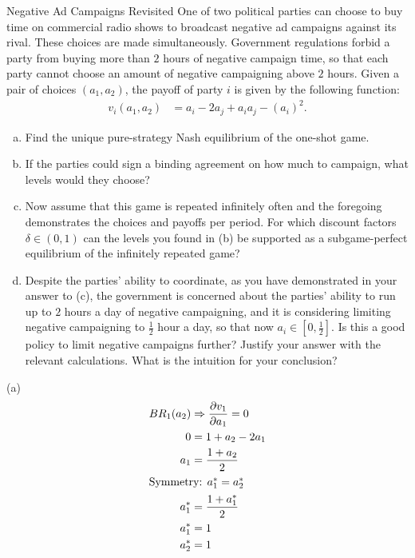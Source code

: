 \documentclass[8pt]{extarticle}
\begin{document}
  \begin{problem}{Negative Ad Campaigns Revisited}
    One of two political parties can choose to buy time on commercial radio shows to broadcast negative ad campaigns against its rival. These choices are made simultaneously. Government regulations forbid a party from buying more than $2$ hours of negative campaign time, so that each party cannot choose an amount of negative campaigning above $2$ hours. Given a pair of choices $(a_1,a_2)$, the payoff of party $i$ is given by the following function:
    \begin{align*}
      v_i(a_1,a_2) &= a_i - 2a_j + a_ia_j - (a_i)^2.
    \end{align*}
    \begin{enumerate}[(a)]
      \item Find the unique pure-strategy Nash equilibrium of the one-shot game.
      \item If the parties could sign a binding agreement on how much to campaign, what levels would they choose?
      \item Now assume that this game is repeated infinitely often and the foregoing demonstrates the choices and payoffs per period. For which discount factors $\delta\in (0,1)$ can the levels you found in (b) be supported as a subgame-perfect equilibrium of the infinitely repeated game?
      \item Despite the parties' ability to coordinate, as you have demonstrated in your answer to (c), the government is concerned about the parties' ability to run up to $2$ hours a day of negative campaigning, and it is considering limiting negative campaigning to $\frac{1}{2}$ hour a day, so that now $a_i \in \left[0,\frac{1}{2}\right]$. Is this a good policy to limit negative campaigns further? Justify your answer with the relevant calculations. What is the intuition for your conclusion?
    \end{enumerate}
    \tcblower
    \begin{problem}{(a)}
      \begin{align*}
        BR_1(a_2) &\Rightarrow \frac{\partial v_1}{\partial a_1} = 0\\
        0 &= 1 + a_2 - 2a_1\\
        a_1 &= \frac{1 + a_2}{2}\\
        \shortintertext{Symmetry: $a_1^{\ast} = a_2^{\ast}$}
        a_1^{\ast} &= \frac{1 + a_1^{\ast}}{2}\\
        a_1^{\ast} &= 1\\
        a_2^{\ast} &= 1\\

\end{align*}
\end{problem}
\end{problem}
\end{document}
